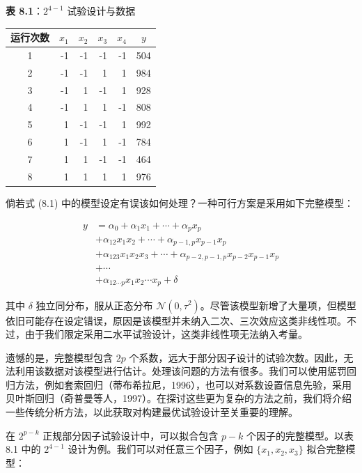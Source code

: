 \documentclass{ctexart}
\begin{document}
\begin{mdquote}
\textbf{表 8.1}：$2^{4-1}$ 试验设计与数据
\end{mdquote}

\begin{table}[htbp]
\begin{tabular}{c|r|r|r|r|c}
\hline
运行次数 & $x_1$ & $x_2$ & $x_3$ & $x_4$ & $y$ \\
\hline
1 & -1 & -1 & -1 & -1 & 504 \\
2 & -1 & -1 & 1 & 1 & 984 \\
3 & -1 & 1 & -1 & 1 & 928 \\
4 & -1 & 1 & 1 & -1 & 808 \\
5 & 1 & -1 & -1 & 1 & 992 \\
6 & 1 & -1 & 1 & -1 & 784 \\
7 & 1 & 1 & -1 & -1 & 464 \\
8 & 1 & 1 & 1 & 1 & 976 \\
\hline
\end{tabular}
\end{table}

倘若式 (8.1) 中的模型设定有误该如何处理？一种可行方案是采用如下完整模型：

\begin{align*}
y&=\alpha_0+\alpha_1x_1+\cdots+\alpha_px_p\\
&+\alpha_{12}x_1x_2+\cdots+\alpha_{p-1,p}x_{p-1}x_p\\
&+\alpha_{123}x_1x_2x_3+\cdots+\alpha_{p-2,p-1,p}x_{p-2}x_{p-1}x_p\\
&+\cdots\\
&+\alpha_{12\cdots p}x_1x_2\cdots x_p+\delta
\tag{8.2}
\end{align*}

其中 $\delta$ 独立同分布，服从正态分布 $\mathcal{N}(0,\tau^2)$。尽管该模型新增了大量项，但模型依旧可能存在设定错误，原因是该模型并未纳入二次、三次效应这类非线性项。不过，由于我们限定采用二水平试验设计，这类非线性项无法纳入考量。

遗憾的是，完整模型包含 $2p$ 个系数，远大于部分因子设计的试验次数。因此，无法利用该数据对该模型进行估计。处理该问题的方法有很多。我们可以使用惩罚回归方法，例如套索回归（蒂布希拉尼，1996），也可以对系数设置信息先验，采用贝叶斯回归（奇普曼等人，1997）。在探讨这些更为复杂的方法之前，我们将介绍一些传统分析方法，以此获取对构建最优试验设计至关重要的理解。

在 $2^{p-k}$ 正规部分因子试验设计中，可以拟合包含 $p-k$ 个因子的完整模型。以表 8.1 中的 $2^{4-1}$ 设计为例。我们可以对任意三个因子，例如 $\{x_1,x_2,x_3\}$ 拟合完整模型：
\end{document}
